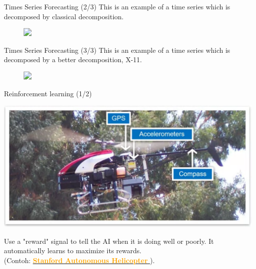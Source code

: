 \documentclass[pdf]{beamer}
\theoremstyle{mystyle}
\begin{document}
\begin{frame}{Times Series Forecasting (2/3)}
	This is an example of a time series which is decomposed by classical decomposition.
	\begin{figure}[!ht]
		\centering
		\includegraphics<2->[scale=.4]{classical-empl-1}
	\end{figure}		
\end{frame}

\begin{frame}{Times Series Forecasting (3/3)}
	This is an example of a time series which is decomposed by a better decomposition, X-11.
	\begin{figure}[!ht]
		\centering
		\includegraphics<2->[scale=.4]{x11-1}
	\end{figure}		
\end{frame}

\begin{frame}{Reinforcement learning (1/2)}
	\begin{center}
		\includegraphics[scale=.325]{reinforcement-learning}
	\end{center}
	Use a "reward" signal to tell the AI when it is doing well or poorly. It automatically learns to maximize its rewards. \\
	(Contoh: \href{https://drive.google.com/file/d/19Zb2hjhyJ6lEUXo_OHQ0RSLrKSf6188x/view?usp=sharing}{\textcolor {orange} {\textbf{Stanford Autonomous Helicopter}} }).
\end{frame}
\end{document}
